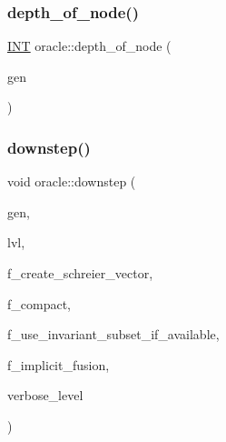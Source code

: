 \mbox{\label{classoracle_a022e34d01ca887785e17c9f3fb25193e}} 
\subsubsection{\texorpdfstring{depth\+\_\+of\+\_\+node()}{depth\_of\_node()}}
{\footnotesize\ttfamily \mbox{\hyperlink{galois_8h_a09fddde158a3a20bd2dcadb609de11dc}{I\+NT}} oracle\+::depth\+\_\+of\+\_\+node (\begin{DoxyParamCaption}\item[{\mbox{\hyperlink{classgenerator}{generator}} $\ast$}]{gen }\end{DoxyParamCaption})}

\mbox{\label{classoracle_a4fbc6710b45e5af5c2fb5bc3aa6d3bb1}} 
\subsubsection{\texorpdfstring{downstep()}{downstep()}}
{\footnotesize\ttfamily void oracle\+::downstep (\begin{DoxyParamCaption}\item[{\mbox{\hyperlink{classgenerator}{generator}} $\ast$}]{gen,  }\item[{\mbox{\hyperlink{galois_8h_a09fddde158a3a20bd2dcadb609de11dc}{I\+NT}}}]{lvl,  }\item[{\mbox{\hyperlink{galois_8h_a09fddde158a3a20bd2dcadb609de11dc}{I\+NT}}}]{f\+\_\+create\+\_\+schreier\+\_\+vector,  }\item[{\mbox{\hyperlink{galois_8h_a09fddde158a3a20bd2dcadb609de11dc}{I\+NT}}}]{f\+\_\+compact,  }\item[{\mbox{\hyperlink{galois_8h_a09fddde158a3a20bd2dcadb609de11dc}{I\+NT}}}]{f\+\_\+use\+\_\+invariant\+\_\+subset\+\_\+if\+\_\+available,  }\item[{\mbox{\hyperlink{galois_8h_a09fddde158a3a20bd2dcadb609de11dc}{I\+NT}}}]{f\+\_\+implicit\+\_\+fusion,  }\item[{\mbox{\hyperlink{galois_8h_a09fddde158a3a20bd2dcadb609de11dc}{I\+NT}}}]{verbose\+\_\+level }\end{DoxyParamCaption})}

\mbox{\label{classoracle_ac774d80f30c7e58e1e87c891ca3ec814}} 
